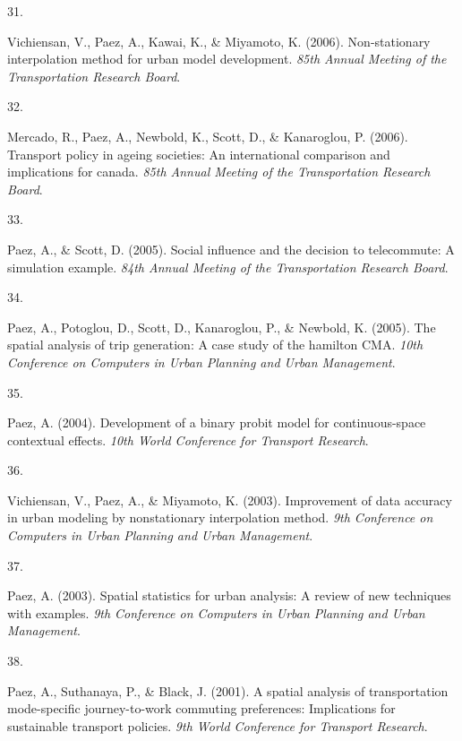 \documentclass[10pt,a4paper,]{twentysecondcv}
\newlength{\csllabelwidth}
\newcommand{\CSLLeftMargin}[1]{\parbox[t]{\csllabelwidth}{#1}}
\newcommand{\CSLRightInline}[1]{\parbox[t]{\linewidth - \csllabelwidth}{#1}}
\begin{document}
\leavevmode{}%
\CSLLeftMargin{31. }%
\CSLRightInline{Vichiensan, V., Paez, A., Kawai, K., \& Miyamoto, K.
(2006). Non-stationary interpolation method for urban model development.
\emph{85th Annual Meeting of the Transportation Research Board}.}

\leavevmode{}%
\CSLLeftMargin{32. }%
\CSLRightInline{Mercado, R., Paez, A., Newbold, K., Scott, D., \&
Kanaroglou, P. (2006). Transport policy in ageing societies: An
international comparison and implications for canada. \emph{85th Annual
Meeting of the Transportation Research Board}.}

\leavevmode{}%
\CSLLeftMargin{33. }%
\CSLRightInline{Paez, A., \& Scott, D. (2005). Social influence and the
decision to telecommute: A simulation example. \emph{84th Annual Meeting
of the Transportation Research Board}.}

\leavevmode{}%
\CSLLeftMargin{34. }%
\CSLRightInline{Paez, A., Potoglou, D., Scott, D., Kanaroglou, P., \&
Newbold, K. (2005). The spatial analysis of trip generation: A case
study of the hamilton CMA. \emph{10th Conference on Computers in Urban
Planning and Urban Management}.}

\leavevmode{}%
\CSLLeftMargin{35. }%
\CSLRightInline{Paez, A. (2004). Development of a binary probit model
for continuous-space contextual effects. \emph{10th World Conference for
Transport Research}.}

\leavevmode{}%
\CSLLeftMargin{36. }%
\CSLRightInline{Vichiensan, V., Paez, A., \& Miyamoto, K. (2003).
Improvement of data accuracy in urban modeling by nonstationary
interpolation method. \emph{9th Conference on Computers in Urban
Planning and Urban Management}.}

\leavevmode{}%
\CSLLeftMargin{37. }%
\CSLRightInline{Paez, A. (2003). Spatial statistics for urban analysis:
A review of new techniques with examples. \emph{9th Conference on
Computers in Urban Planning and Urban Management}.}

\leavevmode{}%
\CSLLeftMargin{38. }%
\CSLRightInline{Paez, A., Suthanaya, P., \& Black, J. (2001). A spatial
analysis of transportation mode-specific journey-to-work commuting
preferences: Implications for sustainable transport policies. \emph{9th
World Conference for Transport Research}.}
\end{document}
